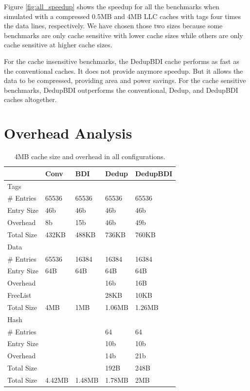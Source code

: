 Figure \ref{fig:all_speedup} shows the speedup for all the benchmarks when simulated with a compressed 0.5MB and 4MB LLC caches with tags four times the data lines, respectively. We have chosen those two sizes because some benchmarks are only cache sensitive with lower cache sizes while others are only cache sensitive at higher cache sizes.\par
For the cache insensitive benchmarks, the DedupBDI cache performs as fast as the conventional caches. It does not provide anymore speedup. But it allows the data to be compressed, providing area and power savings. For the cache sensitive benchmarks, DedupBDI outperforms the conventional, Dedup, and DedupBDI caches altogether.

\section{Overhead Analysis}
\label{sec:Overhead}
\begin{table}[]
    \centering
    \begin{tabular}{lllll}
               & Conv   & BDI    & Dedup  & DedupBDI \\ \hline
    Tags       &        &        &        &          \\
    \# Entries & 65536  & 65536  & 65536  & 65536    \\
    Entry Size & 46b    & 46b    & 46b    & 46b      \\
    Overhead   & 8b     & 15b    & 46b    & 49b      \\
    Total Size & 432KB  & 488KB  & 736KB  & 760KB    \\ \hline
    Data       &        &        &        &          \\
    \# Entries & 65536  & 16384  & 16384  & 16384    \\
    Entry Size & 64B    & 64B    & 64B    & 64B      \\
    Overhead   &        &        & 16b    & 16B      \\
    FreeList   &        &        & 28KB   & 10KB     \\
    Total Size & 4MB    & 1MB    & 1.06MB & 1.26MB   \\ \hline
    Hash       &        &        &        &          \\
    \# Entries &        &        & 64     & 64       \\
    Entry Size &        &        & 10b    & 10b      \\
    Overhead   &        &        & 14b    & 21b      \\
    Total Size &        &        & 192B   & 248B     \\ \hline
    Total Size & 4.42MB & 1.48MB & 1.78MB & 2MB  
    \end{tabular}
    \caption{4MB cache size and overhead in all configurations.}
    \label{tab:overhead}
\end{table}

